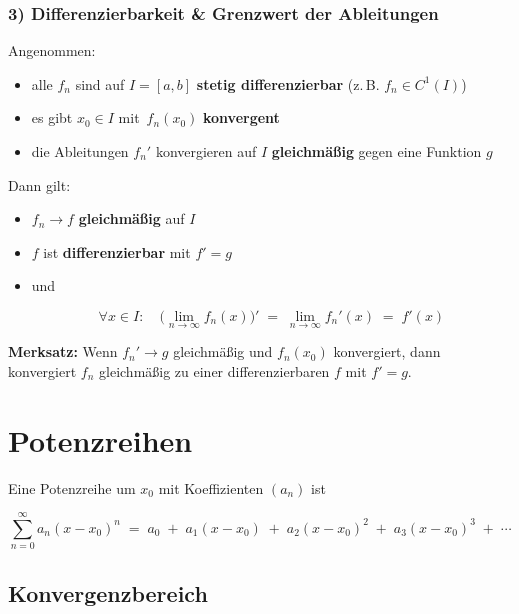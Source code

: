 \documentclass[a4paper,11pt,oneside,open=any,parskip=half, DIV=15]{scrreprt}
\begin{document}
      \subsubsection*{3) Differenzierbarkeit \& Grenzwert der Ableitungen} %
         Angenommen:
         \begin{itemize}
            \item alle \(f_n\) sind auf \(I=[a,b]\) \textbf{stetig differenzierbar} (z.\,B. \(f_n\in C^1(I)\))
            \item es gibt \(x_0\in I\) mit \(\,f_n(x_0)\) \textbf{konvergent}
            \item die Ableitungen \(f_n'\) konvergieren auf \(I\) \textbf{gleichmäßig} gegen eine Funktion \(g\)
         \end{itemize}
         Dann gilt:
         \begin{itemize}
            \item \(f_n\to f\) \textbf{gleichmäßig} auf \(I\)
            \item \(f\) ist \textbf{differenzierbar} mit \(f'=g\)
            \item und
               \begin{importantbox}
                  \[
                     \forall x\in I:\quad \big(\lim_{n\to\infty} f_n(x)\big)' \;=\; \lim_{n\to\infty} f_n'(x) \;=\; f'(x)
                  \]
               \end{importantbox}
         \end{itemize}
         \textbf{Merksatz:} Wenn \(f_n'\to g\) gleichmäßig und \(f_n(x_0)\) konvergiert,
         dann konvergiert \(f_n\) gleichmäßig zu einer differenzierbaren \(f\) mit \(f'=g\).


\section{Potenzreihen}

   Eine Potenzreihe um \(x_0\) mit Koeffizienten \((a_n)\) ist
   \begin{importantbox}
      \[
         \sum_{n=0}^{\infty} a_n (x-x_0)^n
         \;=\;
      a_0 \;+\; a_1(x-x_0) \;+\; a_2(x-x_0)^2 \;+\; a_3(x-x_0)^3 \;+\; \cdots
   \]
   \end{importantbox}

   \subsection*{Konvergenzbereich}
\end{document}
